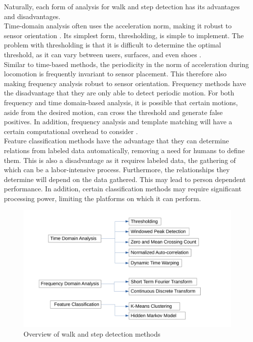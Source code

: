 Naturally, each form of analysis for walk and step detection has its advantages and disadvantages.\\
Time-domain analysis often uses the acceleration norm, making it robust to sensor orientation \cite{Davidson2017}. Its simplest form, thresholding, is simple to implement. The problem with thresholding is that it is difficult to determine the optimal threshold, as it can vary between users, surfaces, and even shoes \cite{Brajdic2013}. \\
Similar to time-based methods, the periodicity in the norm of acceleration during locomotion is frequently invariant to sensor placement. This therefore also making frequency analysis robust to sensor orientation. Frequency methods have the disadvantage that they are only able to detect periodic motion. 
For both frequency and time domain-based analysis, it is possible that certain motions, aside from the desired motion, can cross the threshold and generate false positives. In addition, frequency analysis and template matching will have a certain computational overhead to consider \cite{Davidson2017, Harle2013}. \\
Feature classification methods have the advantage that they can determine relations from labeled data automatically, removing a need for humans to define them. This is also a disadvantage as it requires labeled data, the gathering of which can be a labor-intensive process. Furthermore, the relationships they determine will depend on the data gathered. This may lead to person dependent performance. In addition, certain classification methods may require significant processing power, limiting the platforms on which it can perform.

\begin{figure}[]
	\centering
	\includegraphics[trim=0 15 0 20, clip,width=0.7\linewidth]{images/step_detection_options}
	\caption{Overview of walk and step detection methods}
	\label{fig:step_detection_options}
\end{figure}


